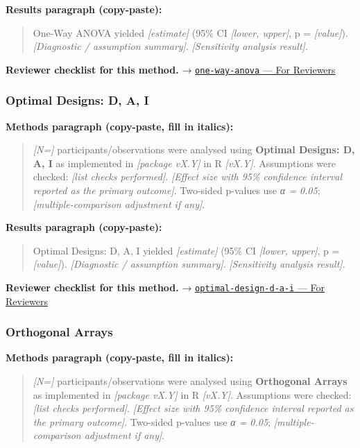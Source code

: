 \documentclass[
]{article}
\begin{document}
\textbf{Results paragraph (copy-paste):}

\begin{quote}
One-Way ANOVA yielded \emph{{[}estimate{]}} (95\% CI \emph{{[}lower,
upper{]}}, p = \emph{{[}value{]}}). \emph{{[}Diagnostic / assumption
summary{]}}. \emph{{[}Sensitivity analysis result{]}}.
\end{quote}

\textbf{Reviewer checklist for this method.} →
\href{../chapters/04-inferential/one-way-anova.Rmd\#for-reviewers}{\texttt{one-way-anova}
--- For Reviewers}

\subsubsection{Optimal Designs: D, A, I}\label{optimal-designs-d-a-i}

\textbf{Methods paragraph (copy-paste, fill in italics):}

\begin{quote}
\emph{{[}N={]}} participants/observations were analysed using
\textbf{Optimal Designs: D, A, I} as implemented in \emph{{[}package
vX.Y{]}} in R \emph{{[}vX.Y{]}}. Assumptions were checked: \emph{{[}list
checks performed{]}}. \emph{{[}Effect size with 95\% confidence interval
reported as the primary outcome{]}}. Two-sided p-values use \emph{α =
0.05}; \emph{{[}multiple-comparison adjustment if any{]}}.
\end{quote}

\textbf{Results paragraph (copy-paste):}

\begin{quote}
Optimal Designs: D, A, I yielded \emph{{[}estimate{]}} (95\% CI
\emph{{[}lower, upper{]}}, p = \emph{{[}value{]}}). \emph{{[}Diagnostic
/ assumption summary{]}}. \emph{{[}Sensitivity analysis result{]}}.
\end{quote}

\textbf{Reviewer checklist for this method.} →
\href{../chapters/16-design/optimal-design-d-a-i.Rmd\#for-reviewers}{\texttt{optimal-design-d-a-i}
--- For Reviewers}

\subsubsection{Orthogonal Arrays}\label{orthogonal-arrays}

\textbf{Methods paragraph (copy-paste, fill in italics):}

\begin{quote}
\emph{{[}N={]}} participants/observations were analysed using
\textbf{Orthogonal Arrays} as implemented in \emph{{[}package vX.Y{]}}
in R \emph{{[}vX.Y{]}}. Assumptions were checked: \emph{{[}list checks
performed{]}}. \emph{{[}Effect size with 95\% confidence interval
reported as the primary outcome{]}}. Two-sided p-values use \emph{α =
0.05}; \emph{{[}multiple-comparison adjustment if any{]}}.
\end{quote}
\end{document}
